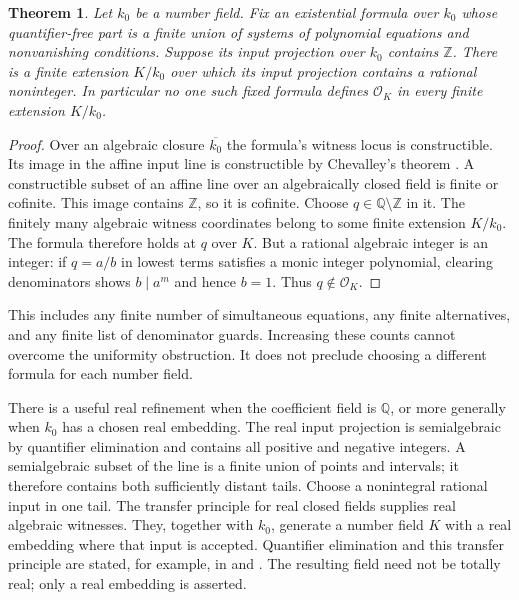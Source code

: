 \documentclass[11pt]{article}
\newtheorem{theorem}{Theorem}[section]
\theoremstyle{definition}
\begin{document}
\begin{theorem}\label{thm:no-uniform-existential-integer-rings-phase3}
Let $k_0$ be a number field.  Fix an existential formula over
$k_0$ whose quantifier-free part is a finite union of systems
of polynomial equations and nonvanishing conditions.
Suppose its input projection over $k_0$ contains $\mathbb Z$.
There is a finite extension $K/k_0$ over which its input
projection contains a rational noninteger.  In particular no
one such fixed formula defines $\mathcal O_K$ in every finite
extension $K/k_0$.
\end{theorem}
\begin{proof}
Over an algebraic closure $\overline{k_0}$ the formula's
witness locus is constructible.  Its image in the affine
input line is constructible by Chevalley's theorem
\cite[Tag 00FE]{StacksChevalley}.  A constructible subset of
an affine line over an algebraically closed field is finite
or cofinite.  This image contains $\mathbb Z$, so it is
cofinite.  Choose $q\in\mathbb Q\setminus\mathbb Z$ in it.
The finitely many algebraic witness coordinates belong to
some finite extension $K/k_0$.  The formula therefore holds
at $q$ over $K$.  But a rational algebraic integer is an
integer: if $q=a/b$ in lowest terms satisfies a monic
integer polynomial, clearing denominators shows $b\mid a^m$
and hence $b=1$.  Thus $q\notin\mathcal O_K$.
\end{proof}

This includes any finite number of simultaneous equations,
any finite alternatives, and any finite list of denominator
guards.  Increasing these counts cannot overcome the
uniformity obstruction.  It does not preclude choosing a
different formula for each number field.

There is a useful real refinement when the coefficient field
is $\mathbb Q$, or more generally when $k_0$ has a chosen
real embedding.  The real input projection is semialgebraic
by quantifier elimination and contains all positive and
negative integers.  A semialgebraic subset of the line is
a finite union of points and intervals; it therefore contains
both sufficiently distant tails.  Choose a nonintegral
rational input in one tail.  The transfer principle for real
closed fields supplies real algebraic witnesses.  They,
together with $k_0$, generate a number field $K$ with a real
embedding where that input is accepted.  Quantifier
elimination and this transfer principle are stated, for
example, in \cite[Theorem 2.1]{Basu2014} and
\cite[Corollary 4.5 and Example 4.6]{Plaumann2023}.
The resulting field need not be totally real; only a real
embedding is asserted.
\end{document}
